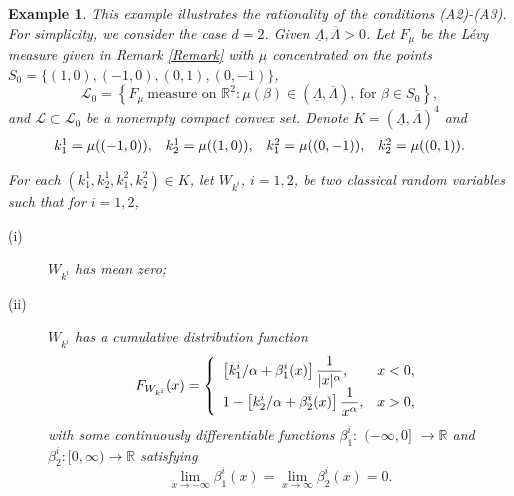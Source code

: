 \documentclass[a4paper,oneside,10pt]{article}%
\newtheorem{example}[theorem]{Example}
\numberwithin{equation}{section}
\begin{document}
\begin{example}
This example illustrates the rationality of the conditions (A2)-(A3). For
simplicity, we consider the case $d=2$. Given $\underline{\Lambda}%
,\overline{\Lambda}>0$. Let $F_{\mu}$ be the L\'{e}vy measure given in Remark
\ref{Remark} with $\mu$ concentrated on the points $S_{0}%
=\{(1,0),(-1,0),(0,1),(0,-1)\}$,
\[
\mathcal{L}_{0}=\left \{  F_{\mu}\  \text{measure on }\mathbb{R}^{2}:\mu
(\beta)\in(\underline{\Lambda},\overline{\Lambda}),\  \text{for }\beta \in
S_{0}\right \}  ,
\]
and $\mathcal{L\subset L}_{0}$ be a nonempty compact convex set. Denote
$K=(\underline{\Lambda},\overline{\Lambda})^{4}$ and
\[%
\begin{array}
[c]{llll}%
k_{1}^{1}=\mu((-1,0)), & k_{2}^{1}=\mu((1,0)), & k_{1}^{2}=\mu((0,-1)), &
k_{2}^{2}=\mu((0,1)).
\end{array}
\]


For each $(k_{1}^{1},k_{2}^{1},k_{1}^{2},k_{2}^{2})\in K$, let $W_{k^{i}}$,
$i=1,2$, be two classical random variables such that for $i=1,2$,

\begin{description}
\item[(i)] $W_{k^{i}}$ has mean zero;

\item[(ii)] $W_{k^{i}}$ has a cumulative distribution function
\[
F_{W_{k^{i}}}(x)=\left \{
\begin{array}
[c]{ll}%
\displaystyle \left[  k_{1}^{i}/\alpha+\beta_{1}^{i}(x)\right]  \frac
{1}{|x|^{\alpha}}, & x<0,\\
\displaystyle1-\left[  k_{2}^{i}/\alpha+\beta_{2}^{i}(x)\right]  \frac
{1}{x^{\alpha}}, & x>0,
\end{array}
\right.
\]
with some continuously differentiable functions $\beta_{1}^{i}:$ $(-\infty,0]$
$\rightarrow \mathbb{R}$ and $\beta_{2}^{i}:[0,\infty)\rightarrow \mathbb{R}$
satisfying
\[
\lim_{x\rightarrow-\infty}\beta_{1}^{i}(x)=\lim_{x\rightarrow \infty}\beta
_{2}^{i}(x)=0.
\]



\end{description}
\end{example}
\end{document}
